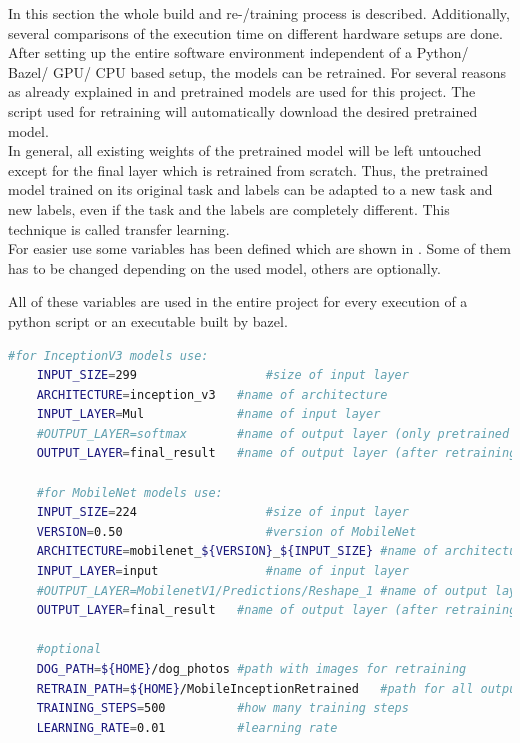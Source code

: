 In this section the whole build and re-/training process is described. Additionally, several comparisons of the execution time on different hardware setups are done. \\

After setting up the entire software environment independent of a Python/ Bazel/ GPU/ CPU based setup, the models can be retrained. For several reasons as already explained in  and  pretrained models are used for this project. The script used for retraining will automatically download the desired pretrained model. \\

In general, all existing weights of the pretrained model will be left untouched except for the final layer which is retrained from scratch. Thus, the pretrained model trained on its original task and labels can be adapted to a new task and new labels, even if the task and the labels are completely different. This technique is called transfer learning. \citep{TensorFlowRetrain2017} \\

For easier use some variables has been defined which are shown in . Some of them has to be changed depending on the used model, others are optionally. 

All of these variables are used in the entire project for every execution of a python script or an executable built by bazel.

\begin{minipage}{\linewidth}
\begin{lstlisting}[caption=Defining terminal variables, label=list:variables, language=bash]
	#for InceptionV3 models	use:
	INPUT_SIZE=299					#size of input layer
	ARCHITECTURE=inception_v3	#name of architecture
	INPUT_LAYER=Mul				#name of input layer
	#OUTPUT_LAYER=softmax		#name of output layer (only pretrained model)
	OUTPUT_LAYER=final_result	#name of output layer (after retraining)
	
	#for MobileNet models use:
	INPUT_SIZE=224					#size of input layer
	VERSION=0.50					#version of MobileNet
	ARCHITECTURE=mobilenet_${VERSION}_${INPUT_SIZE}	#name of architecture
	INPUT_LAYER=input	 			#name of input layer
	#OUTPUT_LAYER=MobilenetV1/Predictions/Reshape_1	#name of output layer (only pretrained model)
	OUTPUT_LAYER=final_result	#name of output layer (after retraining)
	
	#optional
	DOG_PATH=${HOME}/dog_photos	#path with images for retraining
	RETRAIN_PATH=${HOME}/MobileInceptionRetrained	#path for all output data
	TRAINING_STEPS=500			#how many training steps
	LEARNING_RATE=0.01			#learning rate
\end{lstlisting}
\end{minipage}

